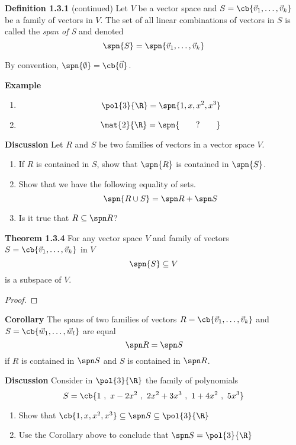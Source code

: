 \documentclass[letterpaper, 10pt]{article}
\begin{document}
\lb
\textbf{Definition 1.3.1} (continued)
\lb
Let $V$ be a vector space and $S = \cb{\vec v_1, \ldots, \vec v_k}$ be a family of vectors
in $V$. The set of all linear combinations of vectors in $S$ is called the \emph{span of S}
and denoted
\[ \spn{S} = \spn{\vec v_1, \ldots, \vec v_k} \]

\pr
By convention, $\spn{\emptyset} = \cb{\vec 0}$.


\lb
\textbf{Example}
\lb
\begin{enumerate}
    \item \[ \pol{3}{\R} = \spn{1, x, x^2, x^3} \]
    \item \[ \mat{2}{\R} = \spn{\qquad ? \qquad } \]
\end{enumerate}


\newpage
\lb
\textbf{Discussion}
\lb
Let $R$ and $S$ be two families of vectors in a vector space $V$.
\begin{enumerate}
    \item
        If $R$ is contained in $S$, show that $\spn{R}$ is contained in $\spn{S}$.
    \item
        Show that we have the following equality of sets.
        \[ \spn{ R \cup S} = \spn R + \spn S \]
    \item
        Is it true that $R \subseteq \spn R$?
\end{enumerate}


\vspace{300pt}


\lb
\textbf{Theorem 1.3.4}
\lb
For any vector space $V$ and family of vectors
$S = \cb{\vec v_1, \ldots, \vec v_k}$ in $V$
\[ \spn{S} \subseteq V\] is a subspace of $V$.
\begin{proof}
    
\end{proof}











\newpage
\lb
\textbf{Corollary}
\lb
The spans of two families of vectors
$R = \cb{\vec v_1, \ldots, \vec v_k}$ and 
$S = \cb{\vec w_1, \ldots, \vec w_l}$ are equal
\[ \spn R = \spn S \]
if $R$ is contained in $\spn S$ and $S$ is contained in $\spn R$.



\vspace{200pt}
\lb
\textbf{Discussion}
\lb
Consider in $\pol{3}{\R}$ the family of polynomials
\[ S = \cb{1 ~,~ x-2x^2 ~,~ 2x^2+3x^3 ~,~ 1+4x^2 ~,~ 5x^3} \]
\begin{enumerate}
    \item Show that $ \cb{1, x, x^2, x^3} \subseteq \spn S \subseteq \pol{3}{\R}$
    \item Use the Corollary above to conclude that $\spn S = \pol{3}{\R}$
\end{enumerate}
\end{document}
